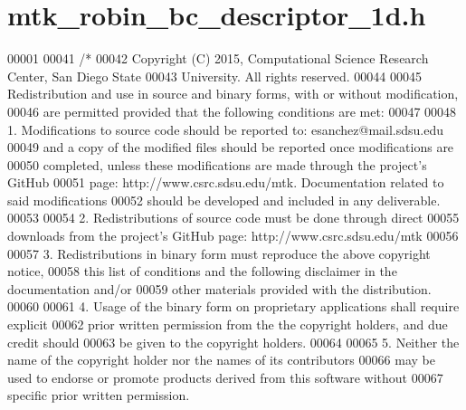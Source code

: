 \hypertarget{mtk__robin__bc__descriptor__1d_8h_source}{\section{mtk\+\_\+robin\+\_\+bc\+\_\+descriptor\+\_\+1d.\+h}
\label{mtk__robin__bc__descriptor__1d_8h_source}
}

\begin{DoxyCode}
00001 
00041 \textcolor{comment}{/*}
00042 \textcolor{comment}{Copyright (C) 2015, Computational Science Research Center, San Diego State}
00043 \textcolor{comment}{University. All rights reserved.}
00044 \textcolor{comment}{}
00045 \textcolor{comment}{Redistribution and use in source and binary forms, with or without modification,}
00046 \textcolor{comment}{are permitted provided that the following conditions are met:}
00047 \textcolor{comment}{}
00048 \textcolor{comment}{1. Modifications to source code should be reported to: esanchez@mail.sdsu.edu}
00049 \textcolor{comment}{and a copy of the modified files should be reported once modifications are}
00050 \textcolor{comment}{completed, unless these modifications are made through the project's GitHub}
00051 \textcolor{comment}{page: http://www.csrc.sdsu.edu/mtk. Documentation related to said modifications}
00052 \textcolor{comment}{should be developed and included in any deliverable.}
00053 \textcolor{comment}{}
00054 \textcolor{comment}{2. Redistributions of source code must be done through direct}
00055 \textcolor{comment}{downloads from the project's GitHub page: http://www.csrc.sdsu.edu/mtk}
00056 \textcolor{comment}{}
00057 \textcolor{comment}{3. Redistributions in binary form must reproduce the above copyright notice,}
00058 \textcolor{comment}{this list of conditions and the following disclaimer in the documentation and/or}
00059 \textcolor{comment}{other materials provided with the distribution.}
00060 \textcolor{comment}{}
00061 \textcolor{comment}{4. Usage of the binary form on proprietary applications shall require explicit}
00062 \textcolor{comment}{prior written permission from the the copyright holders, and due credit should}
00063 \textcolor{comment}{be given to the copyright holders.}
00064 \textcolor{comment}{}
00065 \textcolor{comment}{5. Neither the name of the copyright holder nor the names of its contributors}
00066 \textcolor{comment}{may be used to endorse or promote products derived from this software without}
00067 \textcolor{comment}{specific prior written permission.}

\end{DoxyCode}
